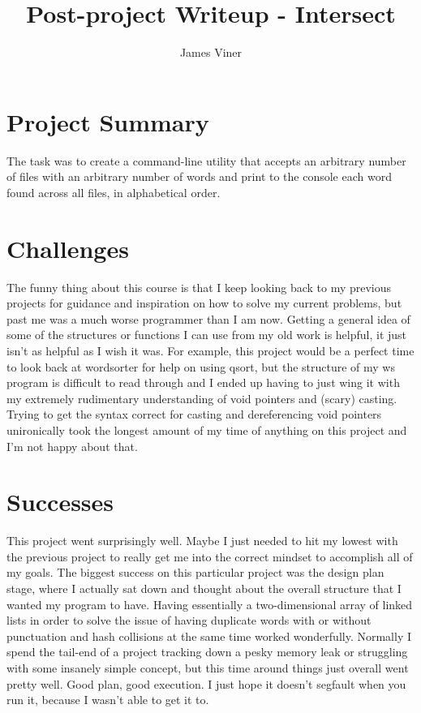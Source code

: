 \documentclass[11pt]{report}
\begin{document}
\title{Post-project Writeup - Intersect}
\author{James Viner}
\date{} %

\maketitle

\doublespacing

\section*{Project Summary}
The task was to create a command-line utility that accepts an arbitrary number of files with an arbitrary number of words and print to the console each word found across all files, in alphabetical order.
\section*{Challenges}
The funny thing about this course is that I keep looking back to my previous projects for guidance and inspiration on how to solve my current problems, but past me was a much worse programmer than I am now. Getting a general idea of some of the structures or functions I can use from my old work is helpful, it just isn't as helpful as I wish it was. For example, this project would be a perfect time to look back at wordsorter for help on using qsort, but the structure of my ws program is difficult to read through and I ended up having to just wing it with my extremely rudimentary understanding of void pointers and (scary) casting. Trying to get the syntax correct for casting and dereferencing void pointers unironically took the longest amount of my time of anything on this project and I'm not happy about that.
\pagebreak
\section*{Successes}
This project went surprisingly well. Maybe I just needed to hit my lowest with the previous project to really get me into the correct mindset to accomplish all of my goals. The biggest success on this particular project was the design plan stage, where I actually sat down and thought about the overall structure that I wanted my program to have. Having essentially a two-dimensional array of linked lists in order to solve the issue of having duplicate words with or without punctuation and hash collisions at the same time worked wonderfully. Normally I spend the tail-end of a project tracking down a pesky memory leak or struggling with some insanely simple concept, but this time around things just overall went pretty well. Good plan, good execution. I just hope it doesn't segfault when you run it, because I wasn't able to get it to.
\end{document}
